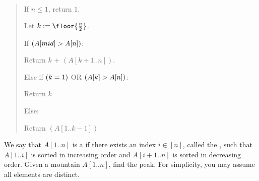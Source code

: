 \documentclass[10pt]{article}
\newcommand{\parof}[1]{\mleft( #1 \mright)}
\begin{document}
\begin{solution}\ %
\begin{quote}%
\noindent{}%


\begin{steps}
  \item If $ n \leq 1 $, return $ 1 $.
  \item Let $ k := \floor{\frac{n}{2}} $.
  \item If $ \parof{A[mid] > A[n]} $:
  \begin{steps}
    \item Return $ k$ + $(A[k+1..n])$.
  \end{steps}
  \item Else if $ \parof{k = 1} $ OR $ \parof{A[k] > A[n] }$:
  \begin{steps}
    \item Return $ k $
  \end{steps}
  \item Else:
  \begin{steps}
    \item Return $(A[1..k-1])$
  \end{steps}
\end{steps}
\end{quote}
\end{solution}
\pagebreak

We say that $A[1..n]$ is a  if there exists an index $i \in [n]$, called the
, such that $A[1..i]$ is sorted in increasing order and $A[i + 1..n]$ is sorted in
decreasing order. Given a mountain $A[1..n]$, find the peak. For simplicity, you may assume all
elements are distinct.
\end{document}
